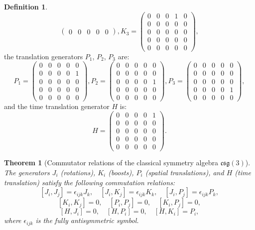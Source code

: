 \documentclass{amsart}
\newtheorem{theorem}{Theorem}[section]
\theoremstyle{definition}
\newtheorem{definition}{Definition}[theorem]
\theoremstyle{remark}
\begin{document}
\begin{definition}
\[\begin{pmatrix}
    0 & 0 & 0 & 0 & 0
  \end{pmatrix},
  K_3 =
  \begin{pmatrix}
    0 & 0 & 0 & 1 & 0 \\
    0 & 0 & 0 & 0 & 0 \\
    0 & 0 & 0 & 0 & 0 \\
    0 & 0 & 0 & 0 & 0 \\
    0 & 0 & 0 & 0 & 0
  \end{pmatrix},
  \]
  the translation generators $P_1$, $P_2$, $P_3$ are:
  \[
  P_1 =
  \begin{pmatrix}
    0 & 0 & 0 & 0 & 0 \\
    0 & 0 & 0 & 0 & 1 \\
    0 & 0 & 0 & 0 & 0 \\
    0 & 0 & 0 & 0 & 0 \\
    0 & 0 & 0 & 0 & 0
  \end{pmatrix},
  P_2 =
  \begin{pmatrix}
    0 & 0 & 0 & 0 & 0 \\
    0 & 0 & 0 & 0 & 0 \\
    0 & 0 & 0 & 0 & 1 \\
    0 & 0 & 0 & 0 & 0 \\
    0 & 0 & 0 & 0 & 0
  \end{pmatrix},
  P_3 =
  \begin{pmatrix}
    0 & 0 & 0 & 0 & 0 \\
    0 & 0 & 0 & 0 & 0 \\
    0 & 0 & 0 & 0 & 0 \\
    0 & 0 & 0 & 0 & 1 \\
    0 & 0 & 0 & 0 & 0
  \end{pmatrix},
  \]
  and the time translation generator $H$ is:
  \[
  H =
  \begin{pmatrix}
    0 & 0 & 0 & 0 & 1 \\
    0 & 0 & 0 & 0 & 0 \\
    0 & 0 & 0 & 0 & 0 \\
    0 & 0 & 0 & 0 & 0 \\
    0 & 0 & 0 & 0 & 0
  \end{pmatrix}.
  \]
\end{definition}

\begin{theorem}[Commutator relations of the classical symmetry algebra $\mathfrak{csg}(3)$]\label{thm:csg3_commutation_relations}
  The generators \(J_i\) (rotations), \(K_i\) (boosts), \(P_i\) (spatial translations), and \(H\) (time translation) satisfy the following commutation relations:
  \[
  [J_i, J_j] = \epsilon_{ijk} J_k, \quad
  [J_i, K_j] = \epsilon_{ijk} K_k, \quad
  [J_i, P_j] = \epsilon_{ijk} P_k,
  \]
  \[
  [K_i, K_j] = 0, \quad
  [P_i, P_j] = 0, \quad
  [K_i, P_j] = 0,
  \]
  \[
  [H, J_i] = 0, \quad
  [H, P_i] = 0, \quad
  [H, K_i] = P_i,
  \]
  where $\epsilon_{ijk}$ is the fully antisymmetric symbol.
\end{theorem}
\end{document}
